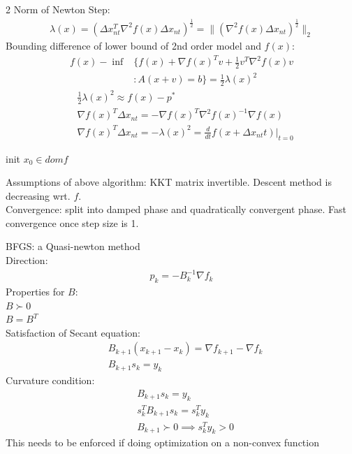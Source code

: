 \documentclass[8pt]{extarticle}
\newcommand{\norm}[1]{\|#1\|}
\begin{document}
\begin{multicols*}{2}
  Norm of Newton Step:
  \begin{align*}
    \lambda(x) = (\Delta x_{nt}^T \nabla^2 f(x) \Delta x_{nt})^{\frac{1}{2}} = \norm{(\nabla^2 f(x) \Delta x_{nt})^{\frac{1}{2}}}_2
  \end{align*}
  Bounding difference of lower bound of 2nd order model and $f(x)$:
  \begin{align*}
    f(x) - \inf & \{ f(x) + \nabla f(x)^T v + \frac{1}{2} v^T \nabla^2 f(x) v\\
                &: A(x+v) = b \} = \frac{1}{2} \lambda(x)^2
  \end{align*}
  \begin{align*}
    &\frac{1}{2}\lambda(x)^2 \approx f(x) -p^*\\
    &\nabla f(x)^T \Delta x_{nt} = - \nabla f(x)^T \nabla^2 f(x)^{-1} \nabla f(x)\\
    &\nabla f(x)^T \Delta x_{nt} = -\lambda(x)^2 = \frac{d}{dt}f(x+\Delta x_{nt}t)|_{t=0}
  \end{align*}
  
  \begin{algorithm}[H]
    init $x_0 \in dom f$\;
    \caption{Newton Method Descent\label{NewtonMethod}}
  \end{algorithm}
  Assumptions of above algorithm: KKT matrix invertible. Descent method is decreasing wrt. $f$.\\
  
  Convergence: split into damped phase and quadratically convergent phase. Fast convergence once step size is 1.

  \vfill\null
  \columnbreak

  BFGS: a Quasi-newton method\\
  Direction:
  \begin{align*}
    p_k = -B_k^{-1} \nabla f_k
  \end{align*}
  Properties for $B$:\\
  $B \succ 0$\\
  $B=B^T$\\
  Satisfaction of Secant equation:
  \begin{align*}
    &B_{k+1} (x_{k+1}-x_k) = \nabla f_{k+1} - \nabla f_k\\
    &B_{k+1} s_k = y_k
  \end{align*}
  Curvature condition:
  \begin{align*}
    &B_{k+1} s_k = y_k\\
    &s_k^T B_{k+1} s_k = s_k^T y_k\\
    &B_{k+1} \succ 0 \implies s_k^T y_k > 0
  \end{align*}
  This needs to be enforced if doing optimization on a non-convex function\\


\end{multicols*}
\end{document}

